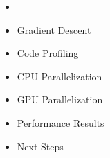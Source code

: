 \begin{frame}
\begin{itemize}
    \item \textbf{\color{red}{What are Multi-Layer Perceptrons}}
    \item Gradient Descent
    \item Code Profiling
    \item CPU Parallelization
    \item GPU Parallelization
    \item Performance Results 
    \item Next Steps
\end{itemize}
\end{frame}



